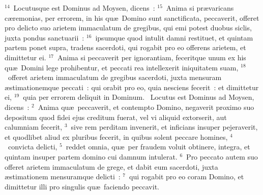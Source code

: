 ${}^{14}$~Locutusque est Dominus ad Moysen, dicens~:
${}^{15}$~Anima si pr\ae varicans c\ae remonias, per errorem, in his qu\ae\ Domino sunt sanctificata, peccaverit, offeret pro delicto suo arietem immaculatum de gregibus, qui emi potest duobus siclis, juxta pondus sanctuarii~:
${}^{16}$~ipsumque quod intulit damni restituet, et quintam partem ponet supra, tradens sacerdoti, qui rogabit pro eo offerens arietem, et dimittetur ei.
${}^{17}$~Anima si peccaverit per ignorantiam, feceritque unum ex his qu\ae\ Domini lege prohibentur, et peccati rea intellexerit iniquitatem suam,
${}^{18}$~offeret arietem immaculatum de gregibus sacerdoti, juxta mensuram \ae stimationemque peccati~: qui orabit pro eo, quia nesciens fecerit~: et dimittetur ei,
${}^{19}$~quia per errorem deliquit in Dominum.
~\lettrine[lines=10,image=true,loversize=0.05,lraise=-0.03]{L}{}ocutus est Dominus ad Moysen, dicens~:
${}^{2}$~Anima qu\ae\ peccaverit, et contempto Domino, negaverit proximo suo depositum quod fidei ejus creditum fuerat, vel vi aliquid extorserit, aut calumniam fecerit,
${}^{3}$~sive rem perditam invenerit, et inficians insuper pejeraverit, et quodlibet aliud ex pluribus fecerit, in quibus solent peccare homines,
${}^{4}$~convicta delicti,
${}^{5}$~reddet omnia, qu\ae\ per fraudem voluit obtinere, integra, et quintam insuper partem domino cui damnum intulerat.
${}^{6}$~Pro peccato autem suo offeret arietem immaculatum de grege, et dabit eum sacerdoti, juxta \ae stimationem mensuramque delicti~:
${}^{7}$~qui rogabit pro eo coram Domino, et dimittetur illi pro singulis qu\ae\ faciendo peccavit.


